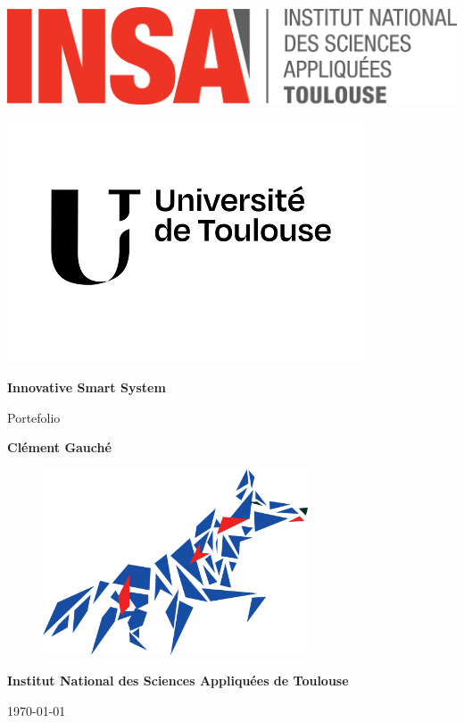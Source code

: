 \begin{titlepage}
    \centering

    \noindent %
    \begin{minipage}{0.5\textwidth}
        \includegraphics[width=0.5\linewidth]{images/logo_INSA.png} %
    \end{minipage}%
    \hfill %
    \begin{minipage}{0.5\textwidth}
        \flushright %
        \includegraphics[width=0.5\linewidth]{images/logo_universite_toulouse.png} %
    \end{minipage}


    \vspace*{2cm} %
    {\Huge\bfseries Innovative Smart System \par}
    \vspace{1cm}
    {\huge Portefolio\par}
    \vspace{2cm}
    {\Large \textbf{Clément Gauché} \par}
    \vspace{2cm}
    
    \begin{figure}[H]
    \centering
    \includegraphics[width=0.7\textwidth]{images/Logo_ISS_sans_texte.png}
    \end{figure}
    
    \vfill
    {\Large \textbf{Institut National des Sciences Appliquées de Toulouse} \par}
    \vspace{1cm}
    {\large \today \par}
\end{titlepage}

